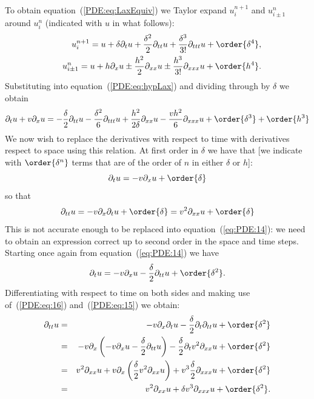 To obtain equation~(\ref{PDE:eq:LaxEquiv}) we Taylor expand
$u_{i}^{n+1}$ and $u_{i\pm 1}^{n}$ around $u_{i}^{n}$ (indicated with
$u$ in what follows):
%
\begin{eqnarray*}
 & & u_{i}^{n+1} = u + \delta \partial_t u +
                 \frac{\delta^2}{2}\partial_{t t} u +
                 \frac{\delta^3}{3!} \partial_{t t t} u + \order{\delta^4}, \\
 & & u_{i\pm 1}^{n} = u + h \partial_x u \pm
                 \frac{h^2}{2}\partial_{x x} u \pm
                 \frac{h^3}{3!} \partial_{x x x} u + \order{h^4} .
\end{eqnarray*}
%
Substituting into equation~(\ref{PDE:eq:hypLax}) and dividing through
by $\delta$ we obtain
%
\begin{equation}
  \partial_t u + v \partial_x u =
  -\frac{\delta}{2} \partial_{t t} u
  -\frac{\delta^2}{6} \partial_{t t t} u
  + \frac{h^2}{2 \delta} \partial_{x x} u
  - \frac{v h^2}{6} \partial_{x x x}u + \order{\delta^3} + \order{h^3}
  \label{eq:PDE:14}
\end{equation}
%
We now wish to replace the derivatives with respect to time with
derivatives respect to space using this relation.  At first order in
$\delta$ we have that [we indicate with $\order{\delta^n}$ terms that are
of the order of $n$ in either $\delta$ or $h$]:
%
\begin{equation}
  \partial_t u = - v \partial_x u + \order{\delta}  \label{PDE:eq:16}
\end{equation}
%
so that
%
\begin{equation}
  \partial_{t t} u = - v \partial_x \partial_t u + \order{\delta} =
  v^2 \partial_{x x} u + \order{\delta}
  \label{PDE:eq:15}
\end{equation}
%
This is not accurate enough to be replaced into
equation~(\ref{eq:PDE:14}): we need to obtain an expression correct up
to second order in the space and time steps.  Starting once again from
equation~(\ref{eq:PDE:14}) we have
%
\begin{equation*}
  \partial_t u = -v \partial_x u
  - \frac{\delta}{2} \partial_{t t} u + \order{\delta^2} .
\end{equation*}
%
Differentiating with respect to time on both sides and making use
of~(\ref{PDE:eq:16}) and~(\ref{PDE:eq:15}) we obtain:
%
\begin{eqnarray*}
 \partial_{t t} u & = & -v \partial_x \partial_t u
   - \frac{\delta}{2} \partial_t \partial_{t t} u + \order{\delta^2} \\
  & = & -v \partial_x \left ( -v \partial_x u
   - \frac{\delta}{2} \partial_{t t} u \right )
   - \frac{\delta}{2} \partial_t v^2 \partial_{x x} u + \order{\delta^2} \\
  & = & v^2 \partial_{x x} u + v \partial_x
        \left ( \frac{\delta}{2} v^2 \partial_{x x} u \right ) +
      v^3 \frac{\delta}{2} \partial_{x x x} u + \order{\delta^2} \\
  & = & v^2 \partial_{x x} u + \delta v^3 \partial_{x x x} u +
      \order{\delta^2}.
\end{eqnarray*}
